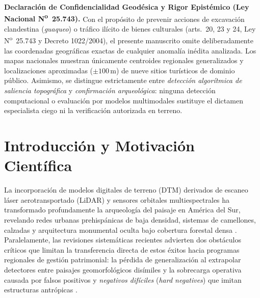 \documentclass[11pt,a4paper]{article}
\DeclareRobustCommand{\_}{\ifmmode\mbox{\textunderscore}\else\textunderscore\allowbreak\fi}
\begin{document}
\begin{tcolorbox}[colback=warnbg,colframe=warnborder,boxrule=0.8pt,arc=2pt,left=7pt,right=7pt,top=4pt,bottom=4pt]
\footnotesize\textbf{\color{amberaccent}Declaraci\'on de Confidencialidad Geod\'esica y Rigor Epist\'emico (Ley Nacional N\textsuperscript{o}~25.743).}
Con el prop\'osito de prevenir acciones de excavaci\'on clandestina (\emph{guaqueo}) o tr\'afico il\'icito de bienes culturales (arts.\ 20, 23 y 24, Ley N\textsuperscript{o}~25.743 y Decreto 1022/2004), el presente manuscrito omite deliberadamente las coordenadas geogr\'aficas exactas de cualquier anomal\'ia in\'edita analizada. Los mapas nacionales muestran \'unicamente centroides regionales generalizados y localizaciones aproximadas ($\pm 100\,\mathrm{m}$) de nueve sitios tur\'isticos de dominio p\'ublico. Asimismo, se distingue estrictamente entre \emph{detecci\'on algor\'itmica de saliencia topogr\'afica} y \emph{confirmaci\'on arqueol\'ogica}: ninguna detecci\'on computacional o evaluaci\'on por modelos multimodales sustituye el dictamen especialista ciego ni la verificaci\'on autorizada en terreno.
\end{tcolorbox}

\section{Introducci\'on y Motivaci\'on Cient\'ifica}

La incorporaci\'on de modelos digitales de terreno (DTM) derivados de escaneo l\'aser aerotransportado (LiDAR) y sensores orbitales multiespectrales ha transformado profundamente la arqueolog\'ia del paisaje en Am\'erica del Sur, revelando redes urbanas prehisp\'anicas de baja densidad, sistemas de camellones, calzadas y arquitectura monumental oculta bajo cobertura forestal densa \citep{Canuto2018,Prumers2022}. Paralelamente, las revisiones sistem\'aticas recientes advierten dos obst\'aculos cr\'iticos que limitan la transferencia directa de estos \'exitos hacia programas regionales de gesti\'on patrimonial: la p\'erdida de generalizaci\'on al extrapolar detectores entre paisajes geomorfol\'ogicos dis\'imiles y la sobrecarga operativa causada por falsos positivos y \emph{negativos dif\'iciles} (\emph{hard negatives}) que imitan estructuras antr\'opicas \citep{Casana2021,Vinci2024}.
\end{document}
